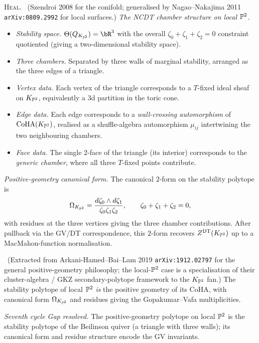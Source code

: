 \textsc{Heal.} \ClaimStatusTheorem\ (Szendroi 2008 for the conifold;
generalised by Nagao--Nakajima 2011 \texttt{arXiv:0809.2992} for local
surfaces.) \emph{The NCDT chamber structure on local $\mathbb{P}^2$.}
\begin{itemize}
\item \emph{Stability space.}
$\Theta(Q_{K_{\bP^2}})=\bR^3$ with the overall $\zeta_0+\zeta_1+\zeta_2=0$
constraint quotiented (giving a two-dimensional stability space).
\item \emph{Three chambers.} Separated by three walls of marginal
stability, arranged as the three edges of a triangle.
\item \emph{Vertex data.} Each vertex of the triangle corresponds to a
$T$-fixed ideal sheaf on $K_{\mathbb{P}^2}$, equivalently a $3$d partition in
the toric cone.
\item \emph{Edge data.} Each edge corresponds to a \emph{wall-crossing
automorphism} of $\mathrm{CoHA}(K_{\mathbb{P}^2})$, realised as a shuffle-algebra
automorphism $\mu_{ij}$ intertwining the two neighbouring chambers.
\item \emph{Face data.} The single 2-face of the triangle (its interior)
corresponds to the \emph{generic chamber}, where all three $T$-fixed
points contribute.
\end{itemize}

\emph{Positive-geometry canonical form.} The canonical $2$-form on the
stability polytope is
\[
\Omega_{K_{\mathbb{P}^2}}=\frac{d\zeta_0\wedge d\zeta_1}{\zeta_0\zeta_1\zeta_2},
\qquad\zeta_0+\zeta_1+\zeta_2=0,
\]
with residues at the three vertices giving the three chamber
contributions. After pullback via the GV/DT correspondence, this
$2$-form recovers $Z^{\mathrm{DT}}(K_{\mathbb{P}^2})$ up to a MacMahon-function
normalisation.

\ClaimStatusConjectured\ (Extracted from Arkani-Hamed--Bai--Lam 2019
\texttt{arXiv:1912.02797} for the general positive-geometry philosophy;
the local-$\mathbb{P}^2$ case is a specialisation of their cluster-algebra
/ GKZ secondary-polytope framework to the $K_{\mathbb{P}^2}$ fan.)
The stability polytope of local $\mathbb{P}^2$ \emph{is} the positive geometry
of its CoHA, with canonical form $\Omega_{K_{\mathbb{P}^2}}$ and residues
giving the Gopakumar--Vafa multiplicities.

\emph{Seventh cycle Gap resolved.} The positive-geometry polytope on
local $\mathbb{P}^2$ is the stability polytope of the Beilinson quiver (a
triangle with three walls); its canonical form and residue structure
encode the GV invariants.

